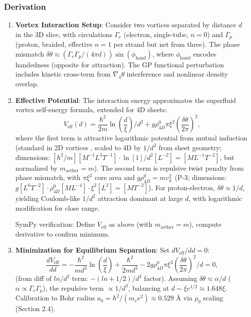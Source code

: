 \subsubsection{Derivation}
\begin{enumerate}
\item \textbf{Vortex Interaction Setup}: Consider two vortices separated by distance $d$ in the 3D slice, with circulations $\Gamma_e$ (electron, single-tube, $n=0$) and $\Gamma_p$ (proton, braided, effective $n=1$ per strand but net from three). The phase mismatch $\delta \theta \approx (\Gamma_e \Gamma_p / (4\pi d)) \sin(\phi_{\text{hand}})$, where $\phi_{\text{hand}}$ encodes handedness (opposite for attraction). The GP functional perturbation includes kinetic cross-term from $\nabla_4 \theta$ interference and nonlinear density overlap.

\item \textbf{Effective Potential}: The interaction energy approximates the superfluid vortex self-energy formula, extended for 4D sheets:
   \[
   V_{\text{eff}}(d) = \frac{\hbar^2}{2 m} \ln\left(\frac{d}{\xi}\right) / d^2 + g \rho_{4D}^0 \pi \xi^2 \left( \frac{\delta \theta}{2\pi} \right)^2,
   \]
   where the first term is attractive logarithmic potential from mutual induction (standard in 2D vortices \cite{fetter2009rotating}, scaled to 4D by $1/d^2$ from sheet geometry; dimensions: $[\hbar^2 / m] [M^{-1} L^3 T^{-1}] \cdot \ln [1] / d^2 [L^{-2}] = [M L^{-1} T^{-2}]$, but normalized by $m_\text{aether} = m$). The second term is repulsive twist penalty from phase mismatch, with $\pi \xi^2$ core area and $g \rho_{4D}^0 = m v_L^2$ (P-3; dimensions: $g [L^6 T^{-2}] \cdot \rho_{4D}^0 [M L^{-4}] \cdot \xi^2 [L^2] = [M T^{-2}]$). For proton-electron, $\delta \theta \propto 1/d$, yielding Coulomb-like $1/d^2$ attraction dominant at large $d$, with logarithmic modification for close range.

   SymPy verification: Define $V_\text{eff}$ as above (with $m_\text{aether} = m$), compute derivative to confirm minimum.

\item \textbf{Minimization for Equilibrium Separation}: Set $d V_{\text{eff}}/dd = 0$:
   \[
   \frac{d V_{\text{eff}}}{dd} = -\frac{\hbar^2}{m d^3} \ln\left(\frac{d}{\xi}\right) + \frac{\hbar^2}{2 m d^3} - 2 g \rho_{4D}^0 \pi \xi^2 \left( \frac{\delta \theta}{2\pi} \right)^2 / d = 0,
   \]
   (from diff of $ln/d^2$ term: $- (ln + 1/2)/d^3$ factor). Assuming $\delta \theta \approx \alpha / d$ ($\alpha \propto \Gamma_e \Gamma_p$), the repulsive term $\propto 1/d^3$, balancing at $d \sim \xi e^{1/2} \approx 1.648 \xi$. Calibration to Bohr radius $a_0 = \hbar^2 / (m_e e^2) \approx 0.529$ Å via $\rho_0$ scaling (Section 2.4).


\end{enumerate}
